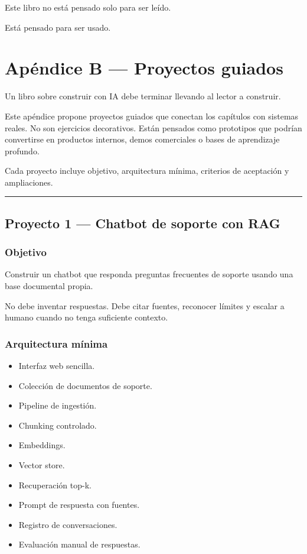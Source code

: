 Este libro no está pensado solo para ser leído.

Está pensado para ser usado.

\newpage

\chapter{Apéndice B --- Proyectos
guiados}\label{apuxe9ndice-b-proyectos-guiados}

Un libro sobre construir con IA debe terminar llevando al lector a
construir.

Este apéndice propone proyectos guiados que conectan los capítulos con
sistemas reales. No son ejercicios decorativos. Están pensados como
prototipos que podrían convertirse en productos internos, demos
comerciales o bases de aprendizaje profundo.

Cada proyecto incluye objetivo, arquitectura mínima, criterios de
aceptación y ampliaciones.

\begin{center}\rule{0.5\linewidth}{0.5pt}\end{center}

\section{Proyecto 1 --- Chatbot de soporte con
RAG}\label{proyecto-1-chatbot-de-soporte-con-rag}

\subsection{Objetivo}\label{objetivo-3}

Construir un chatbot que responda preguntas frecuentes de soporte usando
una base documental propia.

No debe inventar respuestas. Debe citar fuentes, reconocer límites y
escalar a humano cuando no tenga suficiente contexto.

\subsection{Arquitectura mínima}\label{arquitectura-muxednima-1}

\begin{itemize}
\tightlist
\item
  Interfaz web sencilla.
\item
  Colección de documentos de soporte.
\item
  Pipeline de ingestión.
\item
  Chunking controlado.
\item
  Embeddings.
\item
  Vector store.
\item
  Recuperación top-k.
\item
  Prompt de respuesta con fuentes.
\item
  Registro de conversaciones.
\item
  Evaluación manual de respuestas.
\end{itemize}

